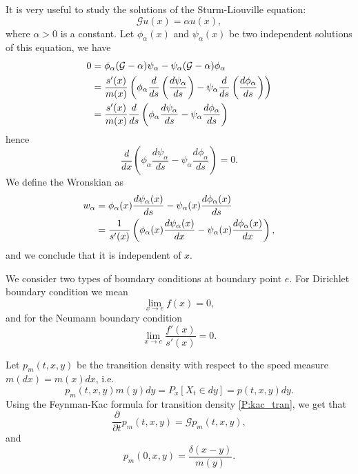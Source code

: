 It is very useful to study the solutions of the Sturm-Liouville equation:
\[
  \mathcal{G} u(x) = \alpha u(x),
\]
where $\alpha>0$ is a constant. Let $\phi_{\alpha}(x)$ and $\psi_{\alpha}(x)$ be
two independent solutions of this equation, we have
\begin{align*}
  0 &= \phi_{\alpha} (\mathcal{G}-\alpha) \psi_{\alpha}
       - \psi_{\alpha} (\mathcal{G}-\alpha) \phi_{\alpha}  \notag \\
    &= \frac{s'(x)}{m(x)} 
       \left( 
         \phi_{\alpha} \frac{d}{ds} \left( \frac{d\psi_{\alpha}}{ds} \right)
         - \psi_{\alpha} \frac{d}{ds} \left( \frac{d\phi_{\alpha}}{ds} \right)
       \right)   \notag \\
    &= \frac{s'(x)}{m(x)} \frac{d}{ds}
       \left( 
         \phi_{\alpha} \frac{d\psi_{\alpha}}{ds} 
         - \psi_{\alpha} \frac{d\phi_{\alpha}}{ds} 
       \right)   \notag \\
\end{align*}
hence
\[
  \frac{d}{dx} \left( 
    \phi_{\alpha} \frac{d\psi_{\alpha}}{ds} 
     - \psi_{\alpha} \frac{d\phi_{\alpha}}{ds} \right) = 0.
\]
We define the Wronskian as
\begin{align} \label{E:wron}
  w_{\alpha} &= \phi_{\alpha}(x) \frac{d\psi_{\alpha}(x)}{ds} 
                - \psi_{\alpha}(x) \frac{d\phi_{\alpha}(x)}{ds} \notag \\
    &= \frac{1}{s'(x)} \left( \phi_{\alpha}(x) \frac{d\psi_{\alpha}(x)}{dx} 
         - \psi_{\alpha}(x) \frac{d\phi_{\alpha}(x)}{dx} \right), 
\end{align}
and we conclude that it is independent of $x$.

We consider two types of boundary conditions at boundary point $e$. For
Dirichlet boundary condition we mean
\begin{equation}
  \lim_{x\to e} f(x) = 0,
\end{equation}
and for the Neumann boundary condition
\begin{equation}
  \lim_{x\to e} \frac{f'(x)}{s'(x)} = 0.
\end{equation}

Let $p_m(t,x,y)$ be the transition density with respect to the speed measure
$m(dx)=m(x)dx$, i.e.
\begin{equation}
  p_m(t,x,y) m(y)dy =P_x[X_t\in dy] = p(t,x,y) dy.
\end{equation}
Using the Feynman-Kac formula for transition density \ref{P:kac_tran}, we get
that
\[
  \frac{\partial}{\partial t} p_m(t,x,y) = \mathcal{G} p_m(t,x,y),
\]
and 
\[
  p_m(0,x,y) = \frac{\delta(x-y)}{m(y)}.
\]

